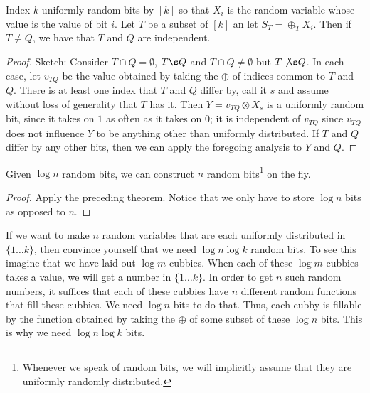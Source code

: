 \documentclass[../main.tex]{subfiles}
\begin{document}
\begin{theorem}
    Index $k$ uniformly random bits by $[k]$ so that $X_{i}$ is the random variable 
    whose value is the value of bit $i$. Let $T$ be a subset of $[k]$ an let
    $S_{T} = \oplus_{T} X_{i}$. Then if $T \not = Q$, we have that $T$ and $Q$ are independent.
\end{theorem}

\begin{proof}
    Sketch: Consider $T \cap Q = \emptyset$, $T \s Q$ and $T \cap Q \not = \emptyset$ but $T \not \s Q$. In each case, let $v_{TQ}$ be the value obtained by taking the $\oplus$ of indices common to $T$ and $Q$. There is at least one index that $T$ and $Q$ differ by, call it $s$ and assume without loss of generality that $T$ has it. Then $Y = v_{TQ} \otimes X_s$ is a uniformly random bit, since it takes on $1$ as often as it takes on $0$; it is independent of $v_{TQ}$ since $v_{TQ}$ does not influence $Y$ to be anything other than uniformly distributed. If $T$ and $Q$ differ by any other bits, then we can apply the foregoing analysis to $Y$ and $Q$.
\end{proof}

\begin{theorem}
    Given $\log n$ random bits, we can construct $n$ random bits\footnote{Whenever we speak of random bits, we will implicitly assume that they are uniformly randomly distributed.} on the fly. 
\end{theorem}

\begin{proof}
    Apply the preceding theorem. Notice that we only have to store $\log n$ bits as opposed to $n$.
\end{proof}

\begin{remark}
    If we want to make $n$ random variables that are each uniformly distributed in $\{1 \dots k\}$, then convince yourself that we need $\log n \log k$ random bits. To see this imagine that we have laid out $\log m$ cubbies. When each of these $\log m$ cubbies takes a value, we will get a number in $\{1 \dots k\}$. In order to get $n$ such random numbers, it suffices that each of these cubbies have $n$ different random functions that fill these cubbies. We need $\log n$ bits to do that. Thus, each cubby is fillable by the function obtained by taking the $\oplus$ of some subset of these $\log n$ bits. This is why we need $\log n \log k$ bits. 
\end{remark}
\end{document}
